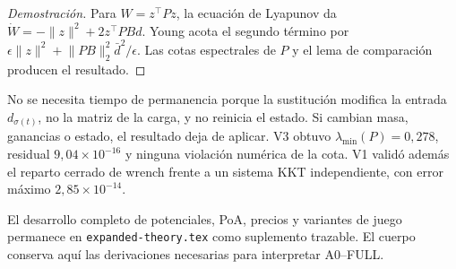 \begin{proof}[Demostración]
Para $W=z^\top Pz$, la ecuación de Lyapunov da $\dot W=-\lVert z\rVert^2+2z^\top PBd$. Young acota el segundo término por $\epsilon\lVert z\rVert^2+\lVert PB\rVert_2^2\bar d^2/\epsilon$. Las cotas espectrales de $P$ y el lema de comparación producen el resultado.
\end{proof}

No se necesita tiempo de permanencia porque la sustitución modifica la entrada $d_{\sigma(t)}$, no la matriz de la carga, y no reinicia el estado. Si cambian masa, ganancias o estado, el resultado deja de aplicar. V3 obtuvo $\lambda_{\min}(P)=0{,}278$, residual $9{,}04\times10^{-16}$ y ninguna violación numérica de la cota. V1 validó además el reparto cerrado de wrench frente a un sistema KKT independiente, con error máximo $2{,}85\times10^{-14}$.

El desarrollo completo de potenciales, PoA, precios y variantes de juego permanece en \texttt{expanded-theory.tex} como suplemento trazable. El cuerpo conserva aquí las derivaciones necesarias para interpretar A0--FULL.
